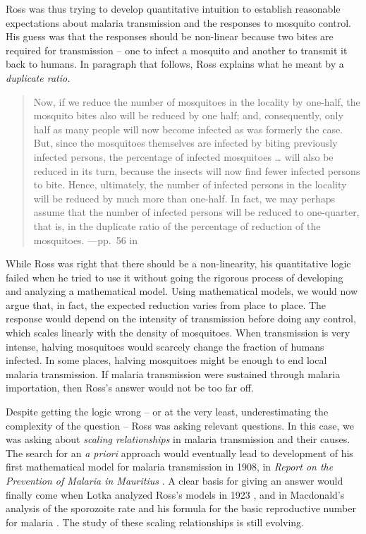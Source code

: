 \documentclass[
]{book}
\begin{document}
Ross was thus trying to develop quantitative intuition to establish reasonable expectations about malaria transmission and the responses to mosquito control. His guess was that the responses should be non-linear because two bites are required for transmission -- one to infect a mosquito and another to transmit it back to humans. In paragraph that follows, Ross explains what he meant by a \emph{duplicate ratio.}

\begin{quote}
Now, if we reduce the number of mosquitoes in the locality by one-half, the mosquito bites also will be reduced by one half; and, consequently, only half as many people will now become infected as was formerly the case. But, since the mosquitoes themselves are infected by biting previously infected persons, the percentage of infected mosquitoes \ldots{} will also be reduced in its turn, because the insects will now find fewer infected persons to bite. Hence, ultimately, the number of infected persons in the locality will be reduced by much more than one-half. In fact, we may perhaps assume that the number of infected persons will be reduced to one-quarter, that is, in the duplicate ratio of the percentage of reduction of the mosquitoes. ---pp.~56 in \autocite{RossR1902MosquitoBrigades}
\end{quote}

While Ross was right that there should be a non-linearity, his quantitative logic failed when he tried to use it without going the rigorous process of developing and analyzing a mathematical model.
Using mathematical models, we would now argue that, in fact, the expected reduction varies from place to place.
The response would depend on the intensity of transmission before doing any control, which scales linearly with the density of mosquitoes.
When transmission is very intense, halving mosquitoes would scarcely change the fraction of humans infected.
In some places, halving mosquitoes might be enough to end local malaria transmission. If malaria transmission were sustained through malaria importation, then Ross's answer would not be too far off.

Despite getting the logic wrong -- or at the very least, underestimating the complexity of the question -- Ross was asking relevant questions.
In this case, we was asking about \emph{scaling relationships} in malaria transmission and their causes.
The search for an \emph{a priori} approach would eventually lead to development of his first mathematical model for malaria transmission in 1908, in \emph{Report on the Prevention of Malaria in Mauritius} \autocite{RossR1908}. A clear basis for giving an answer would finally come when Lotka analyzed Ross's models in 1923 \autocite{LotkaAJ1923part1,LotkaAJ1923part2,LotkaAJ1923part3,LotkaAJ1923part5}, and in Macdonald's analysis of the sporozoite rate \autocite{MacdonaldG1952Sporozoite} and his formula for the basic reproductive number for malaria \autocite{MacdonaldG1952R0}. The study of these scaling relationships is still evolving.
\end{document}
